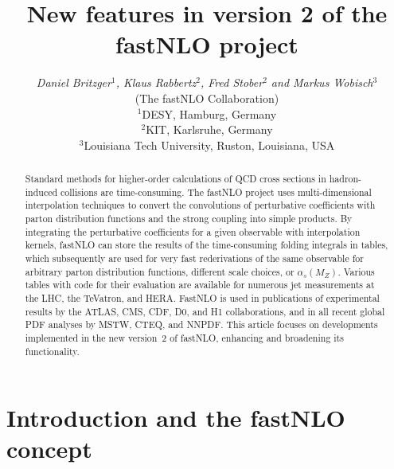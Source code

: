 \documentclass{DISproc}
\begin{document}
\title{New features in version 2 of the fastNLO project}

\author{{\slshape Daniel Britzger$^1$, Klaus Rabbertz$^2$, Fred Stober$^2$ and Markus Wobisch$^3$}\\
  (The fastNLO Collaboration)\\[1ex]
  $^1$DESY, Hamburg, Germany\\
  $^2$KIT, Karlsruhe, Germany\\
  $^3$Louisiana Tech University, Ruston, Louisiana, USA}



\doi %

\maketitle

\begin{abstract}
  Standard methods for higher-order calculations of QCD cross sections
  in hadron-induced collisions are time-consuming. The fastNLO project
  uses multi-dimensional interpolation techniques to convert the
  convolutions of perturbative coefficients with parton distribution
  functions and the strong coupling into simple products.  By
  integrating the perturbative coefficients for a given observable
  with interpolation kernels, fastNLO can store the results of the
  time-consuming folding integrals in tables, which subsequently are
  used for very fast rederivations of the same observable for
  arbitrary parton distribution functions, different scale choices, or
  $\alpha_s(M_Z)$.  Various tables with code for their evaluation are
  available for numerous jet measurements at the LHC, the TeVatron,
  and HERA. FastNLO is used in publications of experimental
  results by the ATLAS, CMS, CDF, D0, and H1 collaborations, and in
  all recent global PDF analyses by MSTW, CTEQ, and NNPDF. This
  article focuses on developments implemented in the new version~2 of
  fastNLO, enhancing and broadening its functionality.
\end{abstract}



\section{Introduction and the fastNLO concept}
\end{document}
